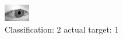 \begin{figure}[h!]
\begin{center}
\includegraphics[width=0.60\columnwidth]{figures/ID2751_class_2_target_1.png}
\end{center}
\caption{ Classification: 2 actual target: 1}
\label{fig:ID2751_class_2_target_1}
\end{figure}
